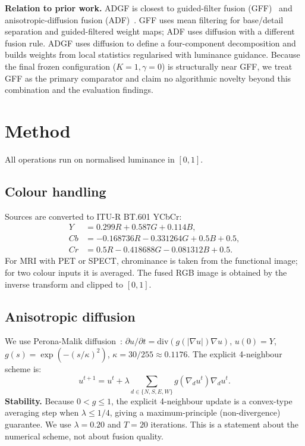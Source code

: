 \documentclass[conference]{IEEEtran}
\begin{document}
\textbf{Relation to prior work.} ADGF is closest to guided-filter fusion (GFF)~\cite{li2013image} and anisotropic-diffusion fusion (ADF)~\cite{bavirisetti2016two}. GFF uses mean filtering for base/detail separation and guided-filtered weight maps; ADF uses diffusion with a different fusion rule. ADGF uses diffusion to define a four-component decomposition and builds weights from local statistics regularised with luminance guidance. Because the final frozen configuration ($K=1, \gamma=0$) is structurally near GFF, we treat GFF as the primary comparator and claim no algorithmic novelty beyond this combination and the evaluation findings.

\section{Method}
All operations run on normalised luminance in $[0, 1]$.

\subsection{Colour handling}
Sources are converted to ITU-R BT.601 YCbCr:
\begin{align}
Y &= 0.299R + 0.587G + 0.114B, \\
Cb &= -0.168736R - 0.331264G + 0.5B + 0.5, \\
Cr &= 0.5R - 0.418688G - 0.081312B + 0.5.
\end{align}
For MRI with PET or SPECT, chrominance is taken from the functional image; for two colour inputs it is averaged. The fused RGB image is obtained by the inverse transform and clipped to $[0, 1]$.

\subsection{Anisotropic diffusion}
We use Perona-Malik diffusion~\cite{perona1990scale}: $\partial u / \partial t = \mathrm{div}(g(|\nabla u|)\nabla u)$, $u(0) = Y$, $g(s) = \exp(-(s/\kappa)^2)$, $\kappa = 30/255 \approx 0.1176$. The explicit 4-neighbour scheme is:
\begin{equation}
u^{t+1} = u^t + \lambda \sum_{d \in \{N,S,E,W\}} g(\nabla_d u^t)\nabla_d u^t.
\end{equation}
\textbf{Stability.} Because $0 < g \le 1$, the explicit 4-neighbour update is a convex-type averaging step when $\lambda \le 1/4$, giving a maximum-principle (non-divergence) guarantee. We use $\lambda = 0.20$ and $T = 20$ iterations. This is a statement about the numerical scheme, not about fusion quality.
\end{document}
